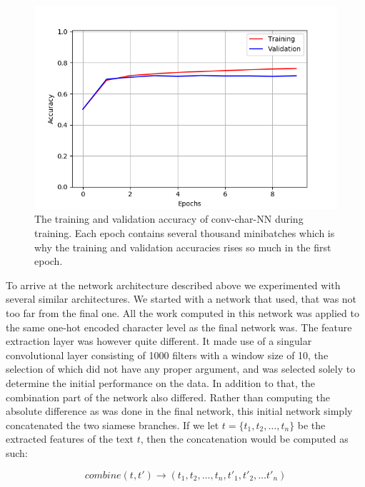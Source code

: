 \begin{figure}
    \centering
    \includegraphics[width=\textwidth]{./pictures/experiments/conv_char_nn/training_accuracy.png}
    \caption{The training and validation accuracy of \gls{conv-char-NN} during
        training. Each epoch contains several thousand minibatches which is why
        the training and validation accuracies rises so much in the first
        epoch.}
    \label{fig:conv-char-NN-accuracies}
\end{figure}

To arrive at the network architecture described above we experimented with
several similar architectures. We started with a network that used,
that was not too far from the final one.
All the work computed in this network was applied to the same one-hot encoded
character level as the final network was. The feature extraction layer
was however quite different. It made use of a singular convolutional layer
consisting of 1000 filters with a window size of 10, the selection
of which did not have any proper argument, and was selected solely to
determine the initial performance on the data.
In addition to that, the combination part of the network also differed.
Rather than computing the absolute difference as was done in the final network,
this initial network simply concatenated the two siamese branches.
If we let $t = \{t_1, t_2, \dots, t_n\}$ be the extracted features of the 
text $t$, then the concatenation would be computed as such:

\begin{equation}
combine(t, t') \rightarrow (t_1, t_2, \dots, t_n, t'_1, t'_2, \dots t'_n)
\end{equation}

